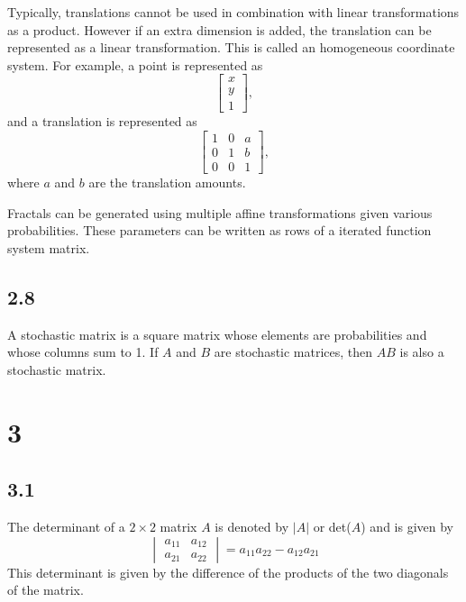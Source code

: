 \documentclass{article}
\begin{document}
    Typically, translations cannot be used in combination with linear transformations as a product.
    However if an extra dimension is added, the translation can be represented as a linear transformation.
    This is called an homogeneous coordinate system. 
    For example, a point is represented as 
    \[
    \begin{bmatrix}
        x \\
        y \\
        1
    \end{bmatrix},
    \]
    and a translation is represented as
    \[
    \begin{bmatrix}
        1 & 0 & a \\
        0 & 1 & b \\
        0 & 0 & 1
    \end{bmatrix},
    \]
    where $a$ and $b$ are the translation amounts.

    Fractals can be generated using multiple affine transformations given various probabilities. 
    These parameters can be written as rows of a iterated function system matrix.
    
    \subsection*{2.8}
    A stochastic matrix is a square matrix whose elements are probabilities and whose columns sum to 1.
    If $A$ and $B$ are stochastic matrices, then $AB$ is also a stochastic matrix.
    
    \section*{3}

    \subsection*{3.1}
    The determinant of a $2 \times 2$ matrix $A$ is denoted by $|A|$ or det($A$) and is given by 
    \[
    \begin{vmatrix}
        a_{11} & a_{12} \\
        a_{21} & a_{22}
    \end{vmatrix}
    = 
    a_{11}a_{22}-a_{12}a_{21}
    \]
    This determinant is given by the difference of the products of the two diagonals of the matrix. 
\end{document}
